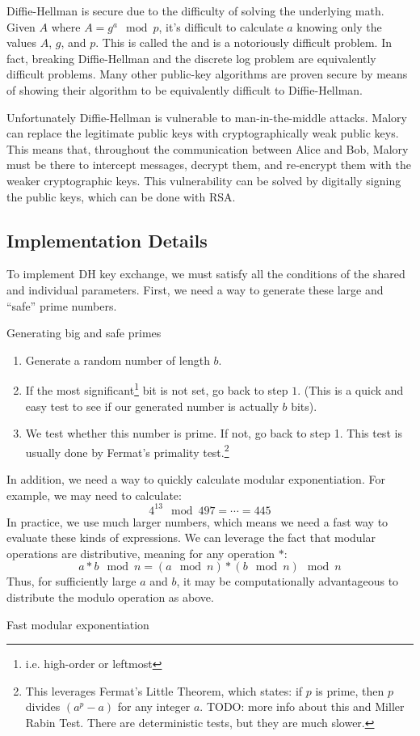 Diffie-Hellman is secure due to the difficulty of solving the underlying math. Given $A$ where $A = g^a \mod p$, it's difficult to calculate $a$ knowing only the values $A$, $g$, and $p$. This is called the  and is a notoriously difficult problem. In fact, breaking Diffie-Hellman and the discrete log problem are equivalently difficult problems. Many other public-key algorithms are proven secure by means of showing their algorithm to be equivalently difficult to Diffie-Hellman.

Unfortunately Diffie-Hellman is vulnerable to man-in-the-middle attacks. Malory can replace the legitimate public keys with cryptographically weak public keys. This means that, throughout the communication between Alice and Bob, Malory must be there to intercept messages, decrypt them, and re-encrypt them with the weaker cryptographic keys. This vulnerability can be solved by digitally signing the public keys, which can be done with RSA.

\subsection{Implementation Details}
To implement DH key exchange, we must satisfy all the conditions of the shared and individual parameters. First, we need a way to generate these large and ``safe'' prime numbers.

\begin{tecbox}{Generating big and safe primes}{}
\begin{enumerate}
    \item Generate a random number of length $b$.
    \item If the most significant\footnote{i.e. high-order or leftmost} bit is not set, go back to step $1$. (This is a quick and easy test to see if our generated number is actually $b$ bits).
    \item We test whether this number is prime. If not, go back to step 1. This test is usually done by Fermat's primality test.\footnote{This leverages Fermat's Little Theorem, which states: if $p$ is prime, then $p$ divides $(a^p - a)$ for any integer $a$. TODO: more info about this and Miller Rabin Test. There are deterministic tests, but they are much slower.}
\end{enumerate}
\end{tecbox}

In addition, we need a way to quickly calculate modular exponentiation. For example, we may need to calculate:
\[ 4^{13} \mod 497 = \cdots = 445 \]
In practice, we use much larger numbers, which means we need a fast way to evaluate these kinds of expressions. We can leverage the fact that modular operations are distributive, meaning for any operation $*$:
\[ a * b \mod n = (a \mod n) * (b \mod n) \mod n \]
Thus, for sufficiently large $a$ and $b$, it may be computationally advantageous to distribute the modulo operation as above.

\begin{tecbox}{Fast modular exponentiation}{}
\end{tecbox}
